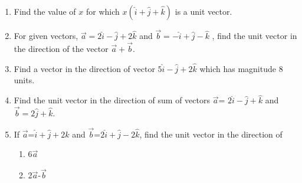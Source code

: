 \begin{enumerate}[label=\thesubsection.\arabic*, ref=\thesubsection.\theenumi]
\item Find the value of $x$ for which $x(\hat{i}+\hat{j}+\hat{k})$ is a unit vector.\\
	\solution
		
\item For given vectors,  $\vec{a}=2\hat{i}-\hat{j}+2\hat{k}$ and $\vec{b}=-\hat{i}+\hat{j}-\hat{k}$ ,  find the unit vector in the
direction of the vector $\vec{a}+\vec{b}$.
        \label{prob:12/10/2/9}
\\
    \solution 
		
\item Find a vector in the direction of vector $5\hat{i}-\hat{j}+2\hat{k}$ which has magnitude 8 units.
        \label{prob:12/10/2/10const}
   \\ 
    \solution 
		
\item Find the unit vector in the direction of sum of vectors $\vec{a}$= $2\hat{i}-\hat{j}+\hat{k}$  and  $\vec{b}=2\hat{j}+\hat{k}$.
\item If $\vec{a}$=$\hat{i}+\hat{j}+2\hat{k}$  and  $\vec{b}$=$2\hat{i}+\hat{j}-2\hat{k}$,  find the unit vector in the direction of
	\begin{enumerate}
		\item 6$\vec{a}$   
		\item 2$\vec{a}$-$\vec{b}$
	\end{enumerate}


\end{enumerate}
